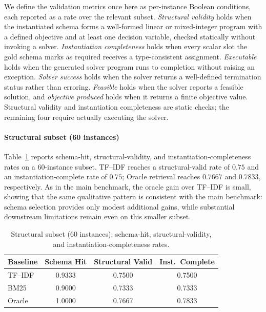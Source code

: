 \documentclass[3p]{elsarticle}
\begin{document}
We define the validation metrics once here as per-instance Boolean conditions, each reported as a rate over the relevant subset. \emph{Structural validity} holds when the instantiated schema forms a well-formed linear or mixed-integer program with a defined objective and at least one decision variable, checked statically without invoking a solver. \emph{Instantiation completeness} holds when every scalar slot the gold schema marks as required receives a type-consistent assignment. \emph{Executable} holds when the generated solver program runs to completion without raising an exception. \emph{Solver success} holds when the solver returns a well-defined termination status rather than erroring. \emph{Feasible} holds when the solver reports a feasible solution, and \emph{objective produced} holds when it returns a finite objective value. Structural validity and instantiation completeness are static checks; the remaining four require actually executing the solver.

\paragraph{Structural subset (60 instances)} Table~\ref{tab:eng-structural} reports schema-hit, structural-validity, and instantiation-completeness rates on a 60-instance subset. TF--IDF reaches a structural-valid rate of $0.75$ and an instantiation-complete rate of $0.75$; Oracle retrieval reaches $0.7667$ and $0.7833$, respectively. As in the main benchmark, the oracle gain over TF--IDF is small, showing that the same qualitative pattern is consistent with the main benchmark: schema selection provides only modest additional gains, while substantial downstream limitations remain even on this smaller subset.

\begin{table}[t]
\centering
\caption{Structural subset (60 instances): schema-hit, structural-validity, and instantiation-completeness rates.}
\label{tab:eng-structural}
\small
\begin{tabular}{lccc}
  \toprule
  Baseline & Schema Hit & Structural Valid & Inst.\ Complete \\
  \midrule
  TF--IDF & 0.9333 & 0.7500 & 0.7500 \\
  BM25    & 0.9000 & 0.7333 & 0.7333 \\
  Oracle  & 1.0000 & 0.7667 & 0.7833 \\
  \bottomrule
\end{tabular}
\end{table}
\end{document}
